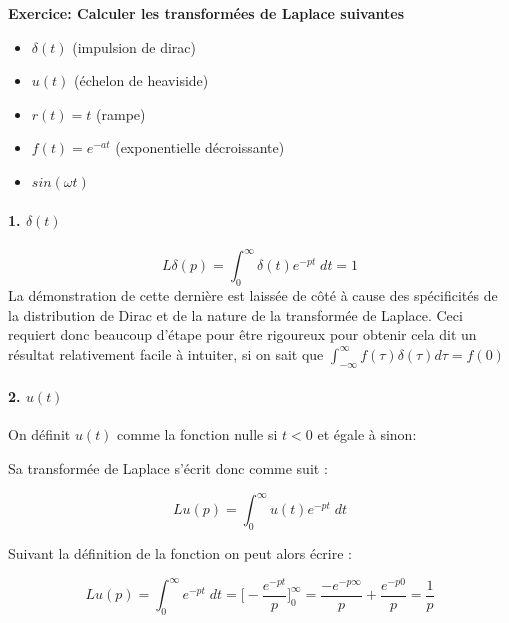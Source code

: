 \documentclass[11pt,a4paper]{article}
\begin{document}
\textbf{Exercice: Calculer les transformées de Laplace suivantes}\\

\begin{itemize}
\item $\delta (t)$ (impulsion de dirac) 
\item $u(t)$ (échelon de heaviside)
\item $r(t) = t$ (rampe)
\item $f(t) = e^{-at}$ (exponentielle décroissante)
\item $sin(\omega t)$
\end{itemize}

\paragraph{\textbf{1.} $\delta (t)$}
\[L{\delta}(p) = \int^{\infty}_{0} \delta(t) e^{-pt} \; dt = 1\] 
La démonstration de cette dernière est laissée de côté à cause des spécificités de la distribution de Dirac et de la nature de la transformée de Laplace. Ceci requiert donc beaucoup d'étape pour être rigoureux pour obtenir cela dit un résultat relativement facile à intuiter, si on sait que $\int^{\infty}_{-\infty}f(\tau)\delta(\tau) d\tau = f(0)$

\paragraph{\textbf{2.} $u (t)$}
On définit $u(t)$ comme la fonction nulle si $t < 0$ et égale à sinon:

\begin{center}
\end{center}

Sa transformée de Laplace s'écrit donc comme suit :

\[L{u}(p) = \int^{\infty}_{0} u(t) e^{-pt} \; dt\] 

Suivant la définition de la fonction on peut alors écrire : 

\[L{u}(p) = \int^{\infty}_{0} e^{-pt} \; dt =  \Big[-\frac{e^{-pt}}{p}\Big]^{\infty}_{0} = \frac{-e^{-p \infty}}{p} + \frac{e^{-p 0}}{p} = \frac{1}{p}  \] 
\end{document}
